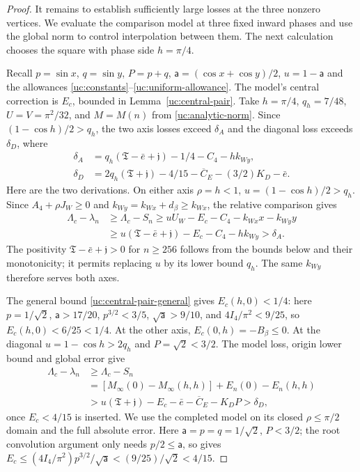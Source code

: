 \begin{proof}
It remains to establish sufficiently large losses at the three
nonzero vertices. We evaluate the comparison model at three fixed
inward phases and use the global norm to control interpolation between
them.  The next calculation chooses the square with phase side
$h=\pi/4$.

Recall $p=\sin x$, $q=\sin y$, $P=p+q$,
$\mathsf a=(\cos x+\cos y)/2$, $u=1-\mathsf a$ and the allowances
\eqref{uc:constants}--\eqref{uc:uniform-allowance}. The model's central
correction is $E_c$, bounded in Lemma~\ref{uc:central-pair}.
Take $h=\pi/4$, $q_h=7/48$, $U=V=\pi^2/32$, and $M=M(n)$ from
\eqref{uc:analytic-norm}.  Since $(1-\cos h)/2>q_h$, the two axis
losses exceed $\delta_A$ and the diagonal loss exceeds $\delta_D$, where
\begin{align*}
 \delta_A&=q_h(\mathfrak{T}-\bar e+\mathfrak{j})-1/4-C_4-hk_{Wy},\\
 \delta_D&=2q_h(\mathfrak{T}+\mathfrak{j})-4/15-\overline C_E-(3/2)K_D-\bar e.
\end{align*}
Here are the two derivations. On either axis $\rho=h<1$,
$u=(1-\cos h)/2>q_h$. Since $A_4+\rho J_W\geq0$ and
$k_{Wy}=k_{Wx}+d_\beta\geq k_{Wx}$, the relative comparison gives
\[
 \begin{aligned}
 \Lambda_c-\lambda_n&\geq\Lambda_c-S_n
 \geq uU_W-E_c-C_4-k_{Wx}x-k_{Wy}y\\
 &\geq u(\mathfrak T-\bar e+\mathfrak j)-E_c-C_4-hk_{Wy}
 >\delta_A.
 \end{aligned}
\]
The positivity $\mathfrak T-\bar e+\mathfrak j>0$ for $n\geq256$
follows from the bounds below and their monotonicity; it permits replacing
$u$ by its lower bound $q_h$. The same $k_{Wy}$ therefore serves both axes.

The general bound \eqref{uc:central-pair-general} gives
$E_c(h,0)<1/4$: here $p=1/\sqrt2$, $\mathsf a>17/20$,
$p^{3/2}<3/5$, $\sqrt{\mathsf a}>9/10$, and
$4I_4/\pi^2<9/25$, so $E_c(h,0)<6/25<1/4$.
At the other axis, $E_c(0,h)=-B_\beta\leq0$.
At the diagonal $u=1-\cos h>2q_h$ and $P=\sqrt2<3/2$.
The model loss, origin lower bound and global error give
\[
 \begin{aligned}
 \Lambda_c-\lambda_n&\geq\Lambda_c-S_n\\
 &=[M_\infty(0)-M_\infty(h,h)]+E_n(0)-E_n(h,h)\\
 &>u(\mathfrak T+\mathfrak j)-E_c-\bar e-\overline C_E-K_DP
 >\delta_D,
 \end{aligned}
\]
once $E_c<4/15$ is inserted. We use the completed model on its closed
$\rho\leq\pi/2$ domain and the full absolute error.
Here $\mathsf{a}=p=q=1/\sqrt2$, $P<3/2$; the root convolution argument only
needs $p/2\leq \mathsf{a}$, so gives
$E_c\leq(4I_4/\pi^2)p^{3/2}/\sqrt {\mathsf{a}}< (9/25)/\sqrt2<4/15$.


\end{proof}
